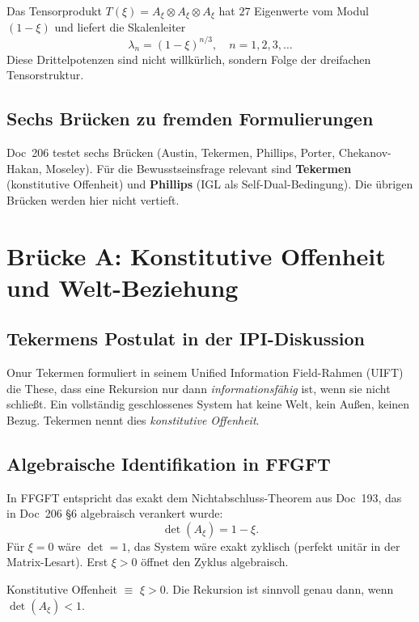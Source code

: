 Das Tensorprodukt $T(\xi) = A_\xi \otimes A_\xi \otimes A_\xi$ hat $27$ Eigenwerte vom Modul $(1-\xi)$ und liefert die Skalenleiter
\[
\lambda_n = (1-\xi)^{n/3}, \quad n = 1, 2, 3, \dots
\]
Diese Drittelpotenzen sind nicht willkürlich, sondern Folge der dreifachen Tensorstruktur.

\subsection{Sechs Brücken zu fremden Formulierungen}

Doc~206 testet sechs Brücken (Austin, Tekermen, Phillips, Porter, Chekanov-Hakan, Moseley). Für die Bewusstseinsfrage relevant sind \textbf{Tekermen} (konstitutive Offenheit) und \textbf{Phillips} (IGL als Self-Dual-Bedingung). Die übrigen Brücken werden hier nicht vertieft.

\section{Brücke A: Konstitutive Offenheit und Welt-Beziehung}\label{sec:brueckeA}

\subsection{Tekermens Postulat in der IPI-Diskussion}

Onur Tekermen formuliert in seinem Unified Information Field-Rahmen (UIFT) die These, dass eine Rekursion nur dann \emph{informationsfähig} ist, wenn sie nicht schließt. Ein vollständig geschlossenes System hat keine Welt, kein Außen, keinen Bezug. Tekermen nennt dies \emph{konstitutive Offenheit}.

\subsection{Algebraische Identifikation in FFGFT}

In FFGFT entspricht das exakt dem Nichtabschluss-Theorem aus Doc~193, das in Doc~206 \S6 algebraisch verankert wurde:
\begin{equation}
\det(A_\xi) = 1 - \xi.
\end{equation}
Für $\xi = 0$ wäre $\det = 1$, das System wäre exakt zyklisch (perfekt unitär in der Matrix-Lesart). Erst $\xi > 0$ öffnet den Zyklus algebraisch.

\begin{insightBox}
Konstitutive Offenheit $\equiv$ $\xi > 0$. Die Rekursion ist sinnvoll genau dann, wenn $\det(A_\xi) < 1$.
\end{insightBox}

